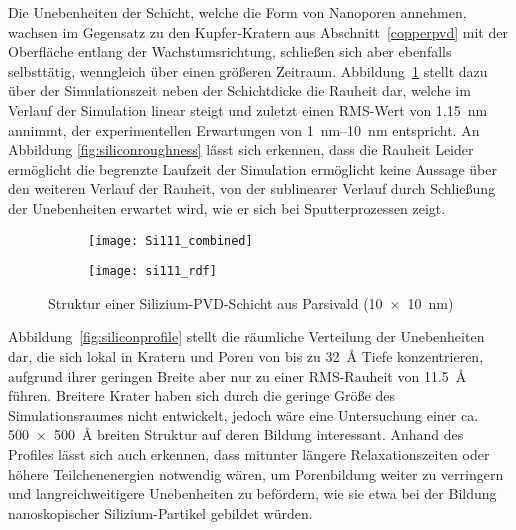Die Unebenheiten der Schicht, welche die Form von Nanoporen annehmen, wachsen im Gegensatz zu den Kupfer-Kratern aus Abschnitt~\ref{copperpvd} mit der Oberfläche entlang der Wachstumsrichtung, schließen sich aber ebenfalls selbsttätig, wenngleich über einen größeren Zeitraum.
Abbildung~\ref{fig:siliconresults-a} stellt dazu über der Simulationszeit neben der Schichtdicke die Rauheit dar, welche im Verlauf der Simulation linear steigt und zuletzt einen RMS-Wert von \SI{1.15}{\nano\meter} annimmt, der experimentellen Erwartungen von \SIrange{1}{10}{\nano\meter} entspricht\cite{gago_nanopatterning_2002}.
An Abbildung \ref{fig:siliconroughness} lässt sich erkennen, dass die Rauheit 
Leider ermöglicht die begrenzte Laufzeit der Simulation ermöglicht keine Aussage über den weiteren Verlauf der Rauheit, von der sublinearer Verlauf durch Schließung der Unebenheiten erwartet wird, wie er sich bei Sputterprozessen zeigt\cite{gago_nanopatterning_2002}.

\begin{figure}
  \captionsetup[subfigure]{singlelinecheck=false}
  \def\subfigwidth{0.48\textwidth}
  \begin{subfigure}[t]{\subfigwidth}
    \texttt{[image: Si111\_combined]}
    \label{fig:siliconresults-a}
  \end{subfigure}
  \hfill
  \begin{subfigure}[t]{\subfigwidth}
    \texttt{[image: si111\_rdf]}
    \label{fig:siliconresults-b}
  \end{subfigure}
  \caption[Struktur einer Silizium-PVD-Schicht aus Parsivald]{
    Struktur einer Silizium-PVD-Schicht aus Parsivald (\SI{10x10}{\nano\meter})
  }
  \label{fig:siliconresults}
\end{figure}

Abbildung~\ref{fig:siliconprofile} stellt die räumliche Verteilung der Unebenheiten dar, die sich lokal in Kratern und Poren von bis zu \SI{32}{\angstrom} Tiefe konzentrieren, aufgrund ihrer geringen Breite aber nur zu einer RMS-Rauheit von \SI{11.5}{\angstrom} führen.
Breitere Krater haben sich durch die geringe Größe des Simulationsraumes nicht entwickelt, jedoch wäre eine Untersuchung einer ca. \SI{500x500}{\angstrom} breiten Struktur auf deren Bildung interessant.
Anhand des Profiles lässt sich auch erkennen, dass mitunter längere Relaxationszeiten oder höhere Teilchenenergien notwendig wären, um Porenbildung weiter zu verringern und langreichweitigere Unebenheiten zu befördern, wie sie etwa bei der Bildung nanoskopischer Silizium-Partikel gebildet würden.

